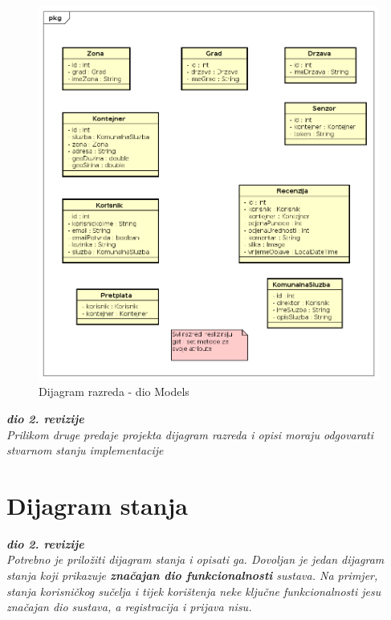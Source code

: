 			\begin{figure}[H]
				\includegraphics[width=1.0\linewidth]{slike/dijagramRazredaModels.png}
				\centering
				\caption{Dijagram razreda - dio Models}
				\label{fig:dijagramRazredaModels}
			\end{figure}
		
			\textbf{\textit{dio 2. revizije}}\\			
			
			\textit{Prilikom druge predaje projekta dijagram razreda i opisi moraju odgovarati stvarnom stanju implementacije}
			
			
			
			\eject
		
		\section{Dijagram stanja}
			
			
			\textbf{\textit{dio 2. revizije}}\\
			
			\textit{Potrebno je priložiti dijagram stanja i opisati ga. Dovoljan je jedan dijagram stanja koji prikazuje \textbf{značajan dio funkcionalnosti} sustava. Na primjer, stanja korisničkog sučelja i tijek korištenja neke ključne funkcionalnosti jesu značajan dio sustava, a registracija i prijava nisu. }
			
